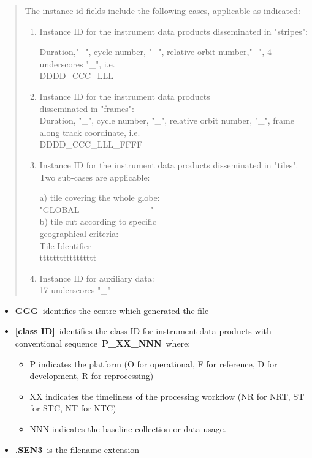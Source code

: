 \documentclass[sigplan,screen]{acmart}
\begin{document}
\begin{quote}
The instance id fields include the following cases, applicable as
indicated:

\begin{enumerate}
\item Instance ID for the instrument data products disseminated in
"stripes":

Duration,"\_", cycle number, "\_", relative orbit number,"\_", 4
underscores "\_", i.e.\\
DDDD\_CCC\_LLL\_\_\_\_\_\\
\item Instance ID for the instrument data products ~\\
disseminated in "frames":\\
Duration, "\_", cycle number, "\_", relative orbit number, "\_", frame
along track coordinate, i.e.\\
DDDD\_CCC\_LLL\_FFFF\\
\item Instance ID for the instrument data products disseminated in
"tiles".\\
Two sub-cases are applicable:

a) tile covering the whole globe:\\
\hspace*{0.333em}\hspace*{0.333em}\hspace*{0.333em}\hspace*{0.333em}\hspace*{0.333em}
"GLOBAL\_\_\_\_\_\_\_\_\_\_\_"\\

b) tile cut according to specific\\
geographical criteria:\\
Tile Identifier\\
ttttttttttttttttt\\
\item Instance ID for auxiliary data:\\
17 underscores "\_"

\end{enumerate}
\end{quote}

\begin{itemize}
\item
  \textbf{GGG}~identifies the centre which generated the file
\item
  \textbf{{[}class ID{]}}~identifies the class ID for instrument data
  products with conventional sequence~\textbf{P\_XX\_NNN}~where:

  \begin{itemize}
  \item
    P indicates the platform (O for operational, F for reference, D for
    development, R for reprocessing)
  \item
    XX indicates the timeliness of the processing workflow (NR for NRT,
    ST for STC, NT for NTC)
  \item
    NNN indicates the baseline collection or data usage.
  \end{itemize}
\item
  \textbf{.SEN3}~is the filename extension
\end{itemize}
\end{document}
